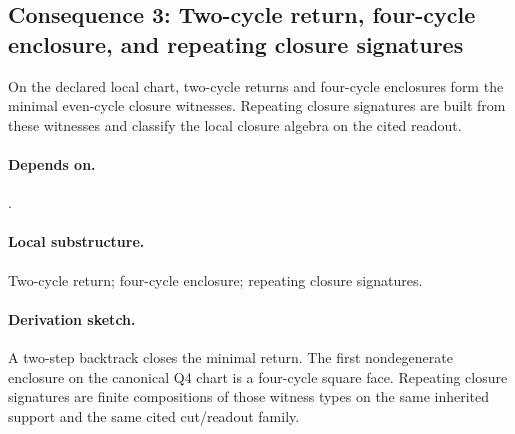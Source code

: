 \subsection{Consequence 3: Two-cycle return, four-cycle enclosure, and repeating closure signatures}
\begin{consequence}\label{cons:c3}
On the declared local chart, two-cycle returns and four-cycle enclosures form the minimal even-cycle closure witnesses. Repeating closure signatures are built from these witnesses and classify the local closure algebra on the cited readout.
\end{consequence}
\paragraph{Depends on.} .
\paragraph{Local substructure.} Two-cycle return; four-cycle enclosure; repeating closure signatures.
\paragraph{Derivation sketch.} A two-step backtrack closes the minimal return. The first nondegenerate enclosure on the canonical Q4 chart is a four-cycle square face. Repeating closure signatures are finite compositions of those witness types on the same inherited support and the same cited cut/readout family.
